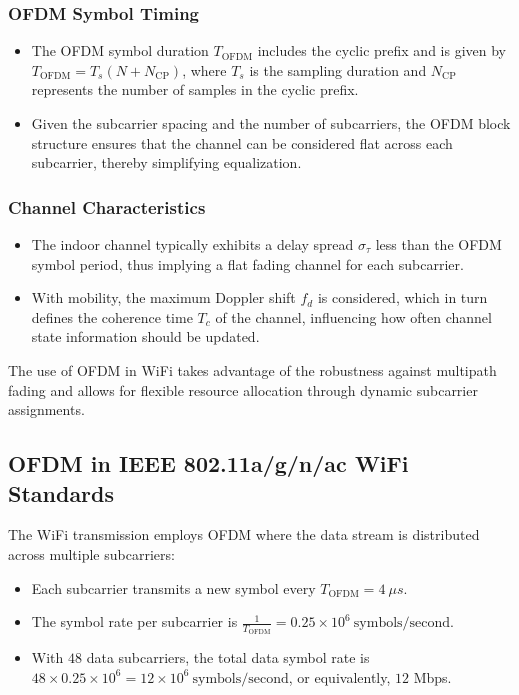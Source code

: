 \subsubsection*{OFDM Symbol Timing}

\begin{itemize}
    \item The OFDM symbol duration \( T_{\text{OFDM}} \) includes the cyclic prefix and is given by \( T_{\text{OFDM}} = T_s (N + N_{\text{CP}}) \), where \( T_s \) is the sampling duration and \( N_{\text{CP}} \) represents the number of samples in the cyclic prefix.
    \item Given the subcarrier spacing and the number of subcarriers, the OFDM block structure ensures that the channel can be considered flat across each subcarrier, thereby simplifying equalization.
\end{itemize}

\subsubsection*{Channel Characteristics}

\begin{itemize}
    \item The indoor channel typically exhibits a delay spread \( \sigma_\tau \) less than the OFDM symbol period, thus implying a flat fading channel for each subcarrier.
    \item With mobility, the maximum Doppler shift \( f_d \) is considered, which in turn defines the coherence time \( T_c \) of the channel, influencing how often channel state information should be updated.
\end{itemize}

The use of OFDM in WiFi takes advantage of the robustness against multipath fading and allows for flexible resource allocation through dynamic subcarrier assignments.



\subsection*{OFDM in IEEE 802.11a/g/n/ac WiFi Standards}

The WiFi transmission employs OFDM where the data stream is distributed across multiple subcarriers:

\begin{itemize}
    \item Each subcarrier transmits a new symbol every $T_{\text{OFDM}} = 4 \ \mu s$.
    \item The symbol rate per subcarrier is $\frac{1}{T_{\text{OFDM}}} = 0.25 \times 10^6 \ \text{symbols/second}$.
    \item With $48$ data subcarriers, the total data symbol rate is $48 \times 0.25 \times 10^6 = 12 \times 10^6 \ \text{symbols/second}$, or equivalently, $12$ Mbps.
\end{itemize}

